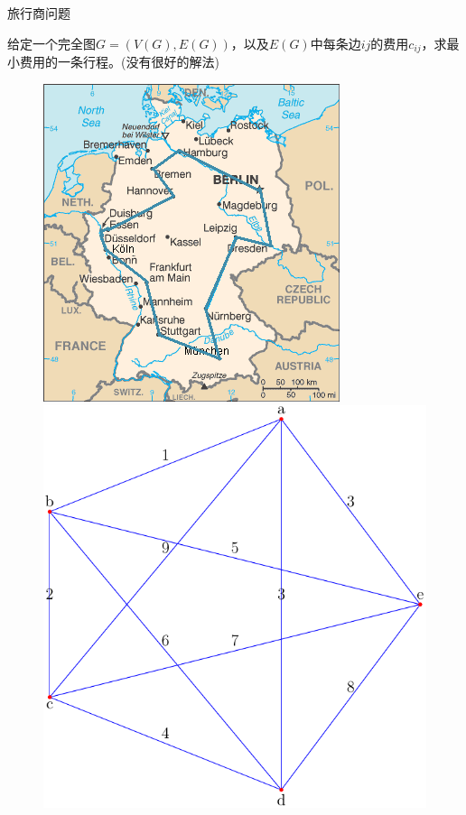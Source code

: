 \documentclass[UTF8]{ctexbeamer}
\begin{document}
\begin{frame}{旅行商问题}
  \begin{block}{}
    给定一个完全图$G=(V(G), E(G))$，以及$E(G)$中每条边$ij$的费用$c_{ij}$，求最小费用的一条行程。(没有很好的解法)
  \end{block}

  \begin{figure}
    \begin{minipage}{.5\linewidth}
      \includegraphics[width=.8\textwidth]{TSP_Deutschland_3.png}
    \end{minipage}%
    \begin{minipage}{.5\linewidth}
      \includegraphics[width=.8\textwidth]{salesman.pdf}
    \end{minipage}
  \end{figure}
  
\end{frame}
\end{document}
